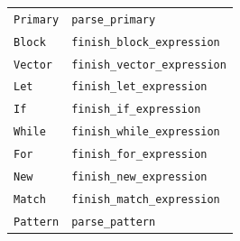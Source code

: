 \documentclass[12pt, a4paper]{article}
\begin{document}
\begin{center}
\begin{longtable}{@{}l l@{}}
\texttt{Primary} & \texttt{parse\_primary} \\
\texttt{Block} & \texttt{finish\_block\_expression} \\
\texttt{Vector} & \texttt{finish\_vector\_expression} \\
\texttt{Let} & \texttt{finish\_let\_expression} \\
\texttt{If} & \texttt{finish\_if\_expression} \\
\texttt{While} & \texttt{finish\_while\_expression} \\
\texttt{For} & \texttt{finish\_for\_expression} \\
\texttt{New} & \texttt{finish\_new\_expression} \\
\texttt{Match} & \texttt{finish\_match\_expression} \\
\texttt{Pattern} & \texttt{parse\_pattern} \\
\bottomrule
\end{longtable}
\end{center}
\end{document}
